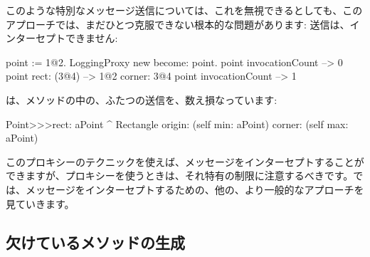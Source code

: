 \documentclass[a4paper,10pt,twoside]{book}
\begin{document}
このような特別なメッセージ送信については、これを無視できるとしても、このアプローチでは、まだひとつ克服できない根本的な問題があります: \self{}送信は、インターセプトできません:
\begin{code}{}
point := 1@2.
LoggingProxy new become: point.
point invocationCount --> 0
point rect: (3@4)        --> 1@2 corner: 3@4
point invocationCount --> 1
\end{code}

は、メソッドの中の、ふたつの\self{}送信を、数え損なっています: %
\begin{code}{}
Point>>>rect: aPoint 
	^ Rectangle  origin: (self min: aPoint) corner: (self max: aPoint)
\end{code}

このプロキシーのテクニックを使えば、メッセージをインターセプトすることができますが、プロキシーを使うときは、それ特有の制限に注意するべきです。では、メッセージをインターセプトするための、他の、より一般的なアプローチを見ていきます。

\subsection{欠けているメソッドの生成}
\end{document}
